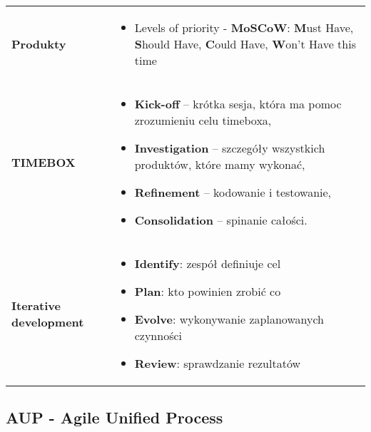 \documentclass[a4paper]{article}
\begin{document}
    \begin{table}[H]
        \begin{center}
            \begin{tabular}{ p{2.5cm} p{13.5cm}}
                \textbf{Produkty}
                &
                \begin{itemize}
                    \item Levels of priority - \textbf{MoSCoW}: \textbf{M}ust Have,
                    \textbf{S}hould Have, \textbf{C}ould Have, \textbf{W}on’t Have this time
                \end{itemize}
                \\

                \textbf{TIMEBOX}
                &
                \begin{itemize}
                    \item \textbf{Kick-off} – krótka sesja, która ma pomoc zrozumieniu celu timeboxa,
                    \item \textbf{Investigation} – szczegóły wszystkich produktów, które mamy wykonać,
                    \item \textbf{Refinement} – kodowanie i testowanie,
                    \item \textbf{Consolidation} – spinanie całości.
                \end{itemize}
                \\

                \textbf{Iterative development}
                &
                \begin{itemize}
                    \item \textbf{Identify}: zespół definiuje cel
                    \item \textbf{Plan}: kto powinien zrobić co
                    \item \textbf{Evolve}: wykonywanie
                    zaplanowanych czynności
                    \item \textbf{Review}: sprawdzanie rezultatów
                \end{itemize}
            \end{tabular}
        \end{center}
    \end{table}

    \subsection{AUP - Agile Unified Process}
\end{document}
